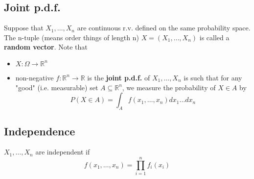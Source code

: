 \subsection*{Joint p.d.f.}
\cite{Und_Chatterjee}
Suppose that \(X_1, \dots, X_n\) are continuous r.v. defined on the same probability space. The n-tuple (means order things of length n) \(X = (X_1, \dots, X_n)\) is called a \textbf{random vector}. Note that 
\begin{itemize}
    \item \(X : \Omega \to  \mathbb{R}^n\)
    \item non-negative \(f: \mathbb{R}^n \to  \mathbb{R}\)  is the \textbf{joint p.d.f.} of \(X_1, \dots,X_n\) is such that for any "good" (i.e. measurable) set \(A \subseteq \mathbb{R}^n\), we measure the probability of \(X\in A\) by   
\[
    P(X \in A) = \int_A f(x_1, \dots, x_n)dx_1 \dots dx_n
\]
\end{itemize}

\subsection*{Independence}
\begin{remark}
    \(X_{1},\dots, X_n \)  are independent if 
    \[
         f(x_1, \dots, x_n) = \prod_{i=1}^n f_i(x_i)
    \]
\end{remark} 
